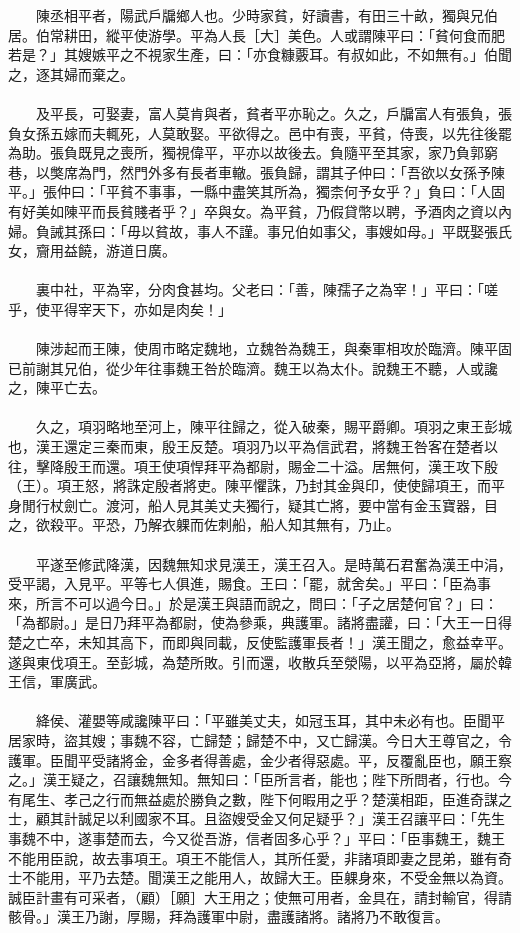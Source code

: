 　　陳丞相平者，陽武戶牖鄉人也。少時家貧，好讀書，有田三十畝，獨與兄伯居。伯常耕田，縱平使游學。平為人長［大］美色。人或謂陳平曰：「貧何食而肥若是？」其嫂嫉平之不視家生產，曰：「亦食糠覈耳。有叔如此，不如無有。」伯聞之，逐其婦而棄之。
\\\\
　　及平長，可娶妻，富人莫肯與者，貧者平亦恥之。久之，戶牖富人有張負，張負女孫五嫁而夫輒死，人莫敢娶。平欲得之。邑中有喪，平貧，侍喪，以先往後罷為助。張負既見之喪所，獨視偉平，平亦以故後去。負隨平至其家，家乃負郭窮巷，以獘席為門，然門外多有長者車轍。張負歸，謂其子仲曰：「吾欲以女孫予陳平。」張仲曰：「平貧不事事，一縣中盡笑其所為，獨柰何予女乎？」負曰：「人固有好美如陳平而長貧賤者乎？」卒與女。為平貧，乃假貸幣以聘，予酒肉之資以內婦。負誡其孫曰：「毋以貧故，事人不謹。事兄伯如事父，事嫂如母。」平既娶張氏女，齎用益饒，游道日廣。
\\\\
　　裏中社，平為宰，分肉食甚均。父老曰：「善，陳孺子之為宰！」平曰：「嗟乎，使平得宰天下，亦如是肉矣！」
\\\\
　　陳涉起而王陳，使周市略定魏地，立魏咎為魏王，與秦軍相攻於臨濟。陳平固已前謝其兄伯，從少年往事魏王咎於臨濟。魏王以為太仆。說魏王不聽，人或讒之，陳平亡去。
\\\\
　　久之，項羽略地至河上，陳平往歸之，從入破秦，賜平爵卿。項羽之東王彭城也，漢王還定三秦而東，殷王反楚。項羽乃以平為信武君，將魏王咎客在楚者以往，擊降殷王而還。項王使項悍拜平為都尉，賜金二十溢。居無何，漢王攻下殷（王）。項王怒，將誅定殷者將吏。陳平懼誅，乃封其金與印，使使歸項王，而平身閒行杖劍亡。渡河，船人見其美丈夫獨行，疑其亡將，要中當有金玉寶器，目之，欲殺平。平恐，乃解衣躶而佐刺船，船人知其無有，乃止。
\\\\
　　平遂至修武降漢，因魏無知求見漢王，漢王召入。是時萬石君奮為漢王中涓，受平謁，入見平。平等七人俱進，賜食。王曰：「罷，就舍矣。」平曰：「臣為事來，所言不可以過今日。」於是漢王與語而說之，問曰：「子之居楚何官？」曰：「為都尉。」是日乃拜平為都尉，使為參乘，典護軍。諸將盡讙，曰：「大王一日得楚之亡卒，未知其高下，而即與同載，反使監護軍長者！」漢王聞之，愈益幸平。遂與東伐項王。至彭城，為楚所敗。引而還，收散兵至滎陽，以平為亞將，屬於韓王信，軍廣武。
\\\\
　　絳侯、灌嬰等咸讒陳平曰：「平雖美丈夫，如冠玉耳，其中未必有也。臣聞平居家時，盜其嫂；事魏不容，亡歸楚；歸楚不中，又亡歸漢。今日大王尊官之，令護軍。臣聞平受諸將金，金多者得善處，金少者得惡處。平，反覆亂臣也，願王察之。」漢王疑之，召讓魏無知。無知曰：「臣所言者，能也；陛下所問者，行也。今有尾生、孝己之行而無益處於勝負之數，陛下何暇用之乎？楚漢相距，臣進奇謀之士，顧其計誠足以利國家不耳。且盜嫂受金又何足疑乎？」漢王召讓平曰：「先生事魏不中，遂事楚而去，今又從吾游，信者固多心乎？」平曰：「臣事魏王，魏王不能用臣說，故去事項王。項王不能信人，其所任愛，非諸項即妻之昆弟，雖有奇士不能用，平乃去楚。聞漢王之能用人，故歸大王。臣躶身來，不受金無以為資。誠臣計畫有可采者，（顧）［願］大王用之；使無可用者，金具在，請封輸官，得請骸骨。」漢王乃謝，厚賜，拜為護軍中尉，盡護諸將。諸將乃不敢復言。
